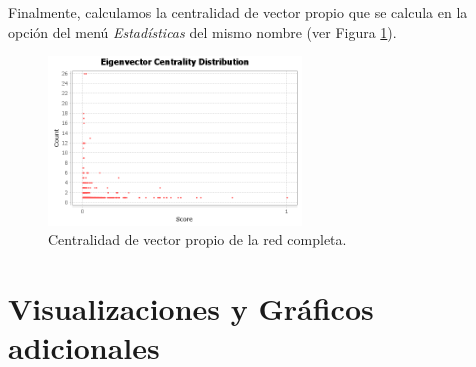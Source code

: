 \documentclass{uimppracticas}
\begin{document}
Finalmente, calculamos la centralidad de vector propio que se calcula en la opción del menú \textit{Estadísticas} del mismo nombre (ver Figura \ref{eigenvector-centralities}).

\begin{figure}[H]
	\centering
	\includegraphics[width=0.6\textwidth]{images/eigenvector-centralities}
	\caption{Centralidad de vector propio de la red completa.}
	\label{eigenvector-centralities}
\end{figure}

\section*{Visualizaciones y Gráficos adicionales}

%
%

\newpage

\renewcommand{\refname}{Bibliografía}


\end{document}
